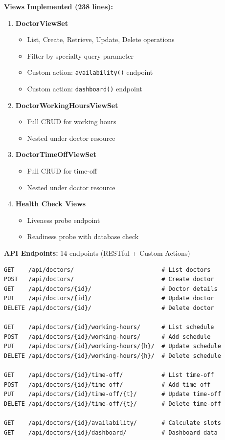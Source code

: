 \documentclass[12pt,a4paper]{article}
\begin{document}
\textbf{Views Implemented (238 lines):}
\begin{enumerate}
    \item \textbf{DoctorViewSet}
    \begin{itemize}
        \item List, Create, Retrieve, Update, Delete operations
        \item Filter by specialty query parameter
        \item Custom action: \texttt{availability()} endpoint
        \item Custom action: \texttt{dashboard()} endpoint
    \end{itemize}

    \item \textbf{DoctorWorkingHoursViewSet}
    \begin{itemize}
        \item Full CRUD for working hours
        \item Nested under doctor resource
    \end{itemize}

    \item \textbf{DoctorTimeOffViewSet}
    \begin{itemize}
        \item Full CRUD for time-off
        \item Nested under doctor resource
    \end{itemize}

    \item \textbf{Health Check Views}
    \begin{itemize}
        \item Liveness probe endpoint
        \item Readiness probe with database check
    \end{itemize}
\end{enumerate}

\textbf{API Endpoints:} 14 endpoints (RESTful + Custom Actions)
\begin{lstlisting}[caption={Doctor Service API Endpoints}]
GET    /api/doctors/                         # List doctors
POST   /api/doctors/                         # Create doctor
GET    /api/doctors/{id}/                    # Doctor details
PUT    /api/doctors/{id}/                    # Update doctor
DELETE /api/doctors/{id}/                    # Delete doctor

GET    /api/doctors/{id}/working-hours/      # List schedule
POST   /api/doctors/{id}/working-hours/      # Add schedule
PUT    /api/doctors/{id}/working-hours/{h}/  # Update schedule
DELETE /api/doctors/{id}/working-hours/{h}/  # Delete schedule

GET    /api/doctors/{id}/time-off/           # List time-off
POST   /api/doctors/{id}/time-off/           # Add time-off
PUT    /api/doctors/{id}/time-off/{t}/       # Update time-off
DELETE /api/doctors/{id}/time-off/{t}/       # Delete time-off

GET    /api/doctors/{id}/availability/       # Calculate slots
GET    /api/doctors/{id}/dashboard/          # Dashboard data
\end{lstlisting}
\end{document}
